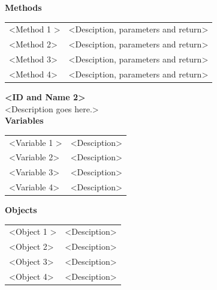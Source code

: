 \documentclass [10pt]{article}
\begin{document}
\textbf{Methods} 
\begin{longtable}{ p{ }  p{ }} \\ 

 
\rowcolor{tableCell} <Method 1 >& <Desciption, parameters and return>\\ 
<Method 2>& <Desciption, parameters and return>\\

\rowcolor{tableCell}<Method 3> & <Desciption, parameters and return> \\ 
<Method 4>& <Desciption, parameters and return> \\

\end{longtable}





\textbf{<ID and Name 2>} \\

<Description goes here.>  \\

\textbf{Variables} 

\begin{longtable}{ p{ }  p{ }} \\ 

 
\rowcolor{tableCell} <Variable 1 >& <Desciption> \\ 
<Variable 2>& <Desciption> \\

\rowcolor{tableCell}<Variable 3> & <Desciption> \\ 
<Variable 4>& <Desciption> \\

\end{longtable}

\textbf{Objects} 
\begin{longtable}{ p{ }  p{ }} \\ 

 
\rowcolor{tableCell} <Object 1 >& <Desciption> \\ 
<Object 2>& <Desciption> \\

\rowcolor{tableCell}<Object 3> & <Desciption> \\ 
<Object 4>& <Desciption> \\

\end{longtable}
\end{document}
